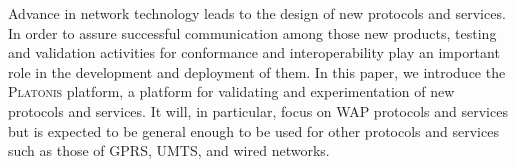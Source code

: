Advance in network technology leads to the design of new 
protocols and services. In order to assure successful 
communication among those new products, testing and 
validation activities for conformance and interoperability 
play an important role in the development and deployment of 
them. In this paper, we introduce the \textsc{Platonis} platform, 
a platform for validating and experimentation of new 
protocols and services.  It will, in particular, focus on WAP
protocols and services but is expected to be general enough to be used 
for other protocols and services such as those of GPRS, 
UMTS, and wired networks. 

